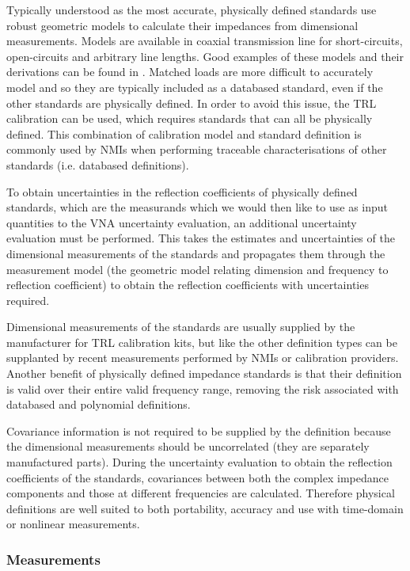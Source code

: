 \documentclass[../thesis/thesis.tex]{subfiles}
\begin{document}
\begin{refsection}
Typically understood as the most accurate, physically defined standards use robust geometric models to calculate their impedances from dimensional measurements. Models are available in coaxial transmission line for short-circuits, open-circuits and arbitrary line lengths. Good examples of these models and their derivations can be found in \cites{Keysight_2016}[Appendix C]{Lewandowski_2010}. Matched loads are more difficult to accurately model and so they are typically included as a databased standard, even if the other standards are physically defined. In order to avoid this issue, the TRL calibration can be used, which requires standards that can all be physically defined. This combination of calibration model and standard definition is commonly used by NMIs when performing traceable characterisations of other standards (i.e. databased definitions).

To obtain uncertainties in the reflection coefficients of physically defined standards, which are the measurands which we would then like to use as input quantities to the VNA uncertainty evaluation, an additional uncertainty evaluation must be performed. This takes the estimates and uncertainties of the dimensional measurements of the standards and propagates them through the measurement model (the geometric model relating dimension and frequency to reflection coefficient) to obtain the reflection coefficients with uncertainties required.

Dimensional measurements of the standards are usually supplied by the manufacturer for TRL calibration kits, but like the other definition types can be supplanted by recent measurements performed by NMIs or calibration providers. Another benefit of physically defined impedance standards is that their definition is valid over their entire valid frequency range, removing the risk associated with databased and polynomial definitions.

Covariance information is not required to be supplied by the definition because the dimensional measurements should be uncorrelated (they are separately manufactured parts). During the uncertainty evaluation to obtain the reflection coefficients of the standards, covariances between both the complex impedance components and those at different frequencies are calculated. Therefore physical definitions are well suited to both portability, accuracy and use with time-domain or nonlinear measurements.

\subsubsection{Measurements}


\end{refsection}
\end{document}
